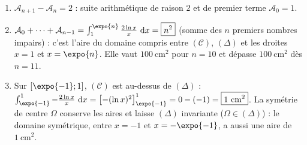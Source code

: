 \begin{corrige}
\begin{sol}
\begin{description}
\begin{enumerate}
      \item $\mathcal{A}_{n+1} - \mathcal{A}_n = 2$ : suite arithm\'etique de raison $2$ et de premier terme $\mathcal{A}_0 = 1$.
      \item $\mathcal{A}_0 + \cdots + \mathcal{A}_{n-1} = \int_1^{\expo{n}} \frac{2\ln x}{x}\dx = \boxed{n^2}$ (somme des $n$ premiers
            nombres impairs) : c'est l'aire du domaine compris entre $(\mathscr{C})$, $(\Delta)$ et les droites $x = 1$ et $x = \expo{n}$.
            Elle vaut $100~\text{cm}^2$ pour $n = 10$ et d\'epasse $100~\text{cm}^2$ d\`es $n = 11$.
      \item Sur $[\expo{-1} ; 1]$, $(\mathscr{C})$ est au-dessus de $(\Delta)$ :
            $\int_{\expo{-1}}^{1} -\frac{2\ln x}{x}\dx = \left[ -(\ln x)^2 \right]_{\expo{-1}}^{1} = 0 - (-1) = \boxed{1~\text{cm}^2}$.
            La sym\'etrie de centre $\Omega$ conserve les aires et laisse $(\Delta)$ invariante ($\Omega \in (\Delta)$) : le domaine
            sym\'etrique, entre $x = -1$ et $x = -\expo{-1}$, a aussi une aire de $1~\text{cm}^2$.
      \end{enumerate}
\end{description}
\end{sol}


\end{corrige}
